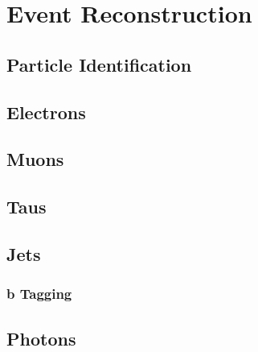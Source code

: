 \chapter{Event Reconstruction}
\section{Particle Identification}
\section{Electrons}
\section{Muons}
\section{Taus}
\section{Jets}
\subsection{b Tagging}
\section{Photons}



